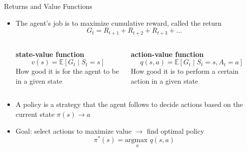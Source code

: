 \documentclass[xcolor=dvipsnames]{beamer}
\begin{document}
\begin{frame}{Returns and Value Functions}
    \begin{itemize}
        \item The agent’s job is to maximize cumulative reward, called the \alert{return}
        \begin{equation*}
            G_t = R_{t+1} + R_{t+2} + R_{t+3} + \dots
        \end{equation*}
        \begin{columns}
            \begin{column}{0.45\textwidth}
                \centering
                \textbf{state-value function}
                \begin{equation*}
                    v(s) = \mathbb{E} [G_t \mid S_t = s]
                \end{equation*}
                How good it is for the agent to be in a given state
            \end{column}
            \begin{column}{0.45\textwidth}
                \centering
                \textbf{action-value function}
                \begin{equation*}
                    q(s,a) = \mathbb{E} [G_t \mid S_t = s, A_t = a]
                \end{equation*}
                How good it is to perform a certain action in a given state
            \end{column}
        \end{columns}
        \vspace{5mm}
        \item A \alert{policy} is a strategy that the agent follows to decide actions based on the current state $\pi(s) \rightarrow a$
        \item Goal: select actions to maximize value $\rightarrow$ \alert{find optimal policy}
        \begin{equation*}
            \pi^*(s) = \underset{a}{\text{argmax }} q(s,a)
        \end{equation*}
    \end{itemize}
\end{frame}

\end{document}
